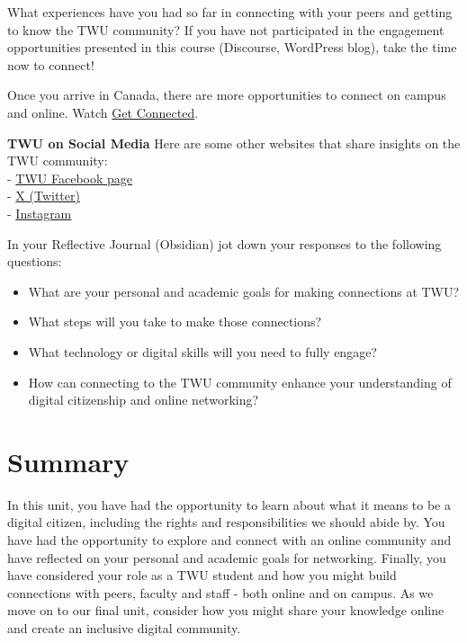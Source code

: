 \documentclass[
]{book}
\providecommand{\tightlist}{%
  \setlength{\itemsep}{0pt}\setlength{\parskip}{0pt}}
\theoremstyle{definition}
\theoremstyle{definition}
\theoremstyle{definition}
\theoremstyle{definition}
\theoremstyle{remark}
\begin{document}
\begin{reflect}
What experiences have you had so far in connecting with your peers and getting to know the TWU community? If you have not participated in the engagement opportunities presented in this course (Discourse, WordPress blog), take the time now to connect!

Once you arrive in Canada, there are more opportunities to connect on campus and online. Watch \href{https://vimeo.com/584977176/f1938444cb}{Get Connected}.

\textbf{TWU on Social Media}
Here are some other websites that share insights on the TWU community:\\
- \href{facebook.com/trinitywestern}{TWU Facebook page}\\
- \href{twitter.com/trinitywestern}{X (Twitter)}\\
- \href{instagram.com/trinitywestern}{Instagram}

In your Reflective Journal (Obsidian) jot down your responses to the following questions:

\begin{itemize}
\tightlist
\item
  What are your personal and academic goals for making connections at TWU?\\
\item
  What steps will you take to make those connections?\\
\item
  What technology or digital skills will you need to fully engage?
\item
  How can connecting to the TWU community enhance your understanding of digital citizenship and online networking?
\end{itemize}
\end{reflect}

\hypertarget{summary-4}{%
\section*{Summary}\label{summary-4}}

In this unit, you have had the opportunity to learn about what it means to be a digital citizen, including the rights and responsibilities we should abide by. You have had the opportunity to explore and connect with an online community and have reflected on your personal and academic goals for networking. Finally, you have considered your role as a TWU student and how you might build connections with peers, faculty and staff - both online and on campus. As we move on to our final unit, consider how you might share your knowledge online and create an inclusive digital community.
\end{document}
